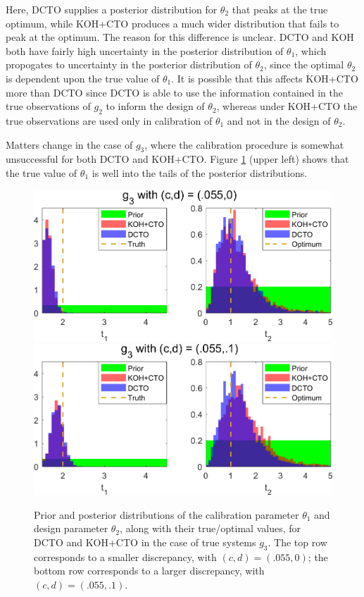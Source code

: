 \documentclass[12pt]{article}
\begin{document}
%
Here, DCTO supplies a posterior distribution for $\theta_2$ that peaks at the true optimum, while KOH+CTO produces a much wider distribution that fails to peak at the optimum.
%
The reason for this difference is unclear.
%
DCTO and KOH both have fairly high uncertainty in the posterior distribution of $\theta_1$, which propogates to uncertainty in the posterior distribution of $\theta_2$, since the optimal $\theta_2$ is dependent upon the true value of $\theta_1$.
%
It is possible that this affects KOH+CTO more than DCTO since DCTO is able to use the information contained in the true observations of $g_2$ to inform the design of $\theta_2$, whereas under KOH+CTO the true observations are used only in calibration of $\theta_1$ and not in the design of $\theta_2$.
%

%
Matters change in the case of $g_3$, where the calibration procedure is somewhat unsuccessful for both DCTO and KOH+CTO.
%
Figure \ref{fig:3_discrep_results} (upper left) shows that the true value of $\theta_1$ is well into the tails of the posterior distributions.
%
\begin{figure}
\centering
\includegraphics[scale=0.85]{FIG_KOHCTO_DCTO_comp_discrep5_results}
\includegraphics[scale=0.85]{FIG_KOHCTO_DCTO_comp_discrep6_results}
\captionsetup{width=.85\linewidth}
\caption{Prior and posterior distributions of the calibration parameter $\theta_1$ and design parameter $\theta_2$, along with their true/optimal values, for DCTO and KOH+CTO in the case of true systems $g_3$. The top row corresponds to a smaller discrepancy, with $(c,d)=(.055,0)$; the bottom row corresponds to a larger discrepancy, with $(c,d)=(.055,.1)$.}
\label{fig:3_discrep_results}
\end{figure}
\end{document}
